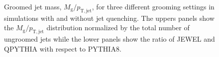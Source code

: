 \begin{figure}[th]
\caption{Groomed jet mass, $M_{\mathrm{g}}/p_{\mathrm{T,jet}}$, for three different grooming settings in simulations with and without jet quenching. The uppers panels show the $M_{\mathrm{g}}/p_{\mathrm{T,jet}}$ distribution normalized by the total number of ungroomed jets while the lower panels show the ratio of JEWEL and QPYTHIA with respect to PYTHIA8.}
\label{fig:SDGenMg}
\end{figure}
%

%
%
%
%
%
%
